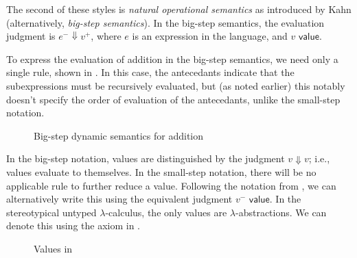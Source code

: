 The second of these styles is \textit{natural operational semantics} as introduced by Kahn \cite{Kahn1987NaturalS} (alternatively, \textit{big-step semantics}). In the big-step semantics, the evaluation judgment is $e^-\Downarrow v^+$, where $e$ is an expression in the language, and $v\textsf{ value}$.

To express the evaluation of addition in the big-step semantics, we need only a single rule, shown in . In this case, the antecedants indicate that the subexpressions must be recursively evaluated, but (as noted earlier) this notably doesn't specify the order of evaluation of the antecedants, unlike the small-step notation.

\begin{figure}
  \centering
  \begin{mdframed}
    \begin{singlespace}
      \begin{mathpar}
      \end{mathpar}
    \end{singlespace}
  \end{mdframed}
  \caption{Big-step dynamic semantics for addition}
  \label{fig:big-step-addition}
\end{figure}

In the big-step notation, values are distinguished by the judgment $v\Downarrow v$; i.e., values evaluate to themselves. In the small-step notation, there will be no applicable rule to further reduce a value. Following the notation from \cite{conf/popl/Hazelnut17,conf/popl/HazelnutLive19}, we can alternatively write this using the equivalent judgment $v^-\textsf{ value}$. In the stereotypical untyped $\lambda$-calculus, the only values are $\lambda$-abstractions. We can denote this using the axiom in .

\begin{figure}
  \centering
  \begin{mdframed}
    \begin{singlespace}
      \begin{mathpar}
      \end{mathpar}
    \end{singlespace}
  \end{mdframed}
  \caption{Values in \ulc}
  \label{fig:value-judgment}
\end{figure}

